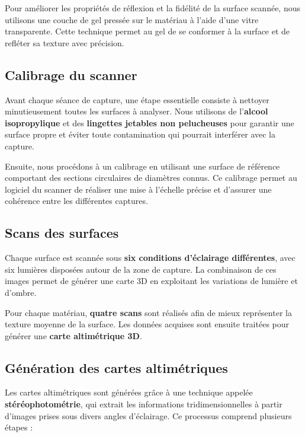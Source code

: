 Pour améliorer les propriétés de réflexion et la fidélité de la surface scannée, nous utilisons une couche de gel pressée sur le matériau à l’aide d’une vitre transparente. Cette technique permet au gel de se conformer à la surface et de refléter sa texture avec précision.

\subsection{Calibrage du scanner}
Avant chaque séance de capture, une étape essentielle consiste à nettoyer minutieusement toutes les surfaces à analyser. Nous utilisons de l’\textbf{alcool isopropylique} et des \textbf{lingettes jetables non pelucheuses} pour garantir une surface propre et éviter toute contamination qui pourrait interférer avec la capture.

Ensuite, nous procédons à un calibrage en utilisant une surface de référence comportant des sections circulaires de diamètres connus. Ce calibrage permet au logiciel du scanner de réaliser une mise à l’échelle précise et d’assurer une cohérence entre les différentes captures.

\subsection{Scans des surfaces}
Chaque surface est scannée sous \textbf{six conditions d’éclairage différentes}, avec six lumières disposées autour de la zone de capture. La combinaison de ces images permet de générer une carte 3D en exploitant les variations de lumière et d’ombre.

Pour chaque matériau, \textbf{quatre scans} sont réalisés afin de mieux représenter la texture moyenne de la surface. Les données acquises sont ensuite traitées pour générer une \textbf{carte altimétrique 3D}.

\subsection{Génération des cartes altimétriques}
Les cartes altimétriques sont générées grâce à une technique appelée \textbf{stéréophotométrie}, qui extrait les informations tridimensionnelles à partir d’images prises sous divers angles d’éclairage. Ce processus comprend plusieurs étapes :

